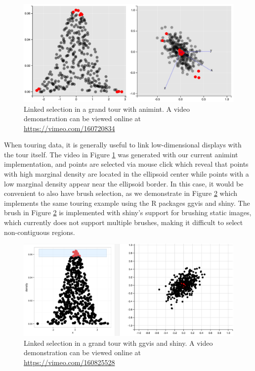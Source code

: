 \documentclass[12pt,]{isuthesis}
\begin{document}
\begin{figure}[htbp]
\centering
\includegraphics{images/tour}
\caption{\label{fig:tour}Linked selection in a grand tour with animint. A
video demonstration can be viewed online at
\url{https://vimeo.com/160720834}}
\end{figure}

When touring data, it is generally useful to link low-dimensional
displays with the tour itself. The video in Figure \ref{fig:tour} was
generated with our current animint implementation, and points are
selected via mouse click which reveal that points with high marginal
density are located in the ellipsoid center while points with a low
marginal density appear near the ellipsoid border. In this case, it
would be convenient to also have brush selection, as we demonstrate in
Figure \ref{fig:tourbrush} which implements the same touring example
using the R packages ggvis and shiny. The brush in Figure
\ref{fig:tourbrush} is implemented with shiny's support for brushing
static images, which currently does not support multiple brushes, making
it difficult to select non-contiguous regions.

\begin{figure}[htbp]
\centering
\includegraphics{images/tourbrush}
\caption{\label{fig:tourbrush}Linked selection in a grand tour with ggvis
and shiny. A video demonstration can be viewed online at
\url{https://vimeo.com/160825528}}
\end{figure}
\end{document}
